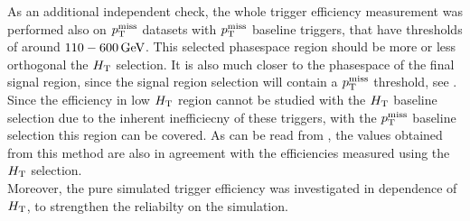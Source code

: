 As an additional independent check, the whole trigger efficiency measurement was performed also on $p_{\mathrm{T}}^\text{miss}$ datasets with $p_{\mathrm{T}}^\text{miss}$ baseline triggers, that have thresholds of around $110-600\,\text{Ge\hspace{-.08em}V}$. This selected phasespace region should be more or less orthogonal the $H_{\mathrm{T}}$ selection. It is also much closer to the phasespace of the final signal region, since the signal region selection will contain a $p_{\mathrm{T}}^\text{miss}$ threshold, see . Since the efficiency in low $H_{\mathrm{T}}$ region cannot be studied with the $H_{\mathrm{T}}$ baseline selection due to the inherent inefficiecny of these triggers, with the $p_{\mathrm{T}}^\text{miss}$ baseline selection this region can be covered. As can be read from , the values obtained from this method are also in agreement with the efficiencies measured using the $H_{\mathrm{T}}$ selection.\\
Moreover, the pure simulated trigger efficiency was investigated in dependence of $H_{\mathrm{T}}$, to strengthen the reliabilty
on the simulation.
